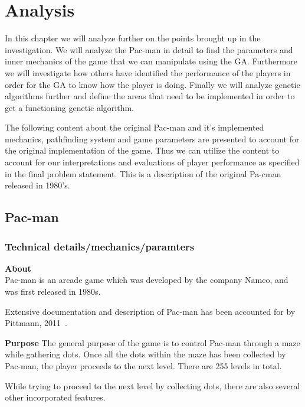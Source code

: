 
\section{Analysis} \label{sec:analysis}
In this chapter we will analyze further on the points brought up in the investigation.
We will analyze the Pac-man in detail to find the parameters and inner mechanics of the game that we can manipulate using the GA.
Furthermore we will investigate how others have identified the performance of the players in order for the GA to know how the player is doing.
Finally we will analyze genetic algorithms further and define the areas that need to be implemented in order to get a functioning genetic algorithm.


The following content about the original Pac-man and it's implemented mechanics, pathfinding system and game parameters are presented to account for the original implementation of the game. Thus we can utilize the content to account for our interpretations and evaluations of player performance as specified in the final problem statement. This is a description of the original Pa-cman released in 1980's. \cite{Pittman2011}



\subsection{Pac-man}\label{ssec:pacmandetail}
\subsubsection{Technical details/mechanics/paramters}

\textbf{About}\\
Pac-man is an arcade game which was developed by the company Namco, and was first released in 1980s.

Extensive documentation and description of Pac-man has been accounted for by Pittmann, 2011~\cite{Pittman2011}.

\textbf{Purpose}
The general purpose of the game is to control Pac-man through a maze while gathering dots. Once all the dots within the maze has been collected by Pac-man, the player proceeds to the next level. There are 255 levels in total.

While trying to proceed to the next level by collecting dots, there are also several other incorporated features.

